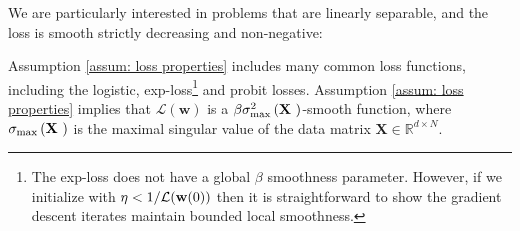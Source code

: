 \documentclass[twoside,11pt,english]{article}
\begin{document}
We are particularly interested in problems that are linearly separable,
and the loss is smooth strictly decreasing and non-negative:

{}

{}

Assumption \ref{assum: loss properties} includes many common loss functions, including the logistic, exp-loss\footnote{The exp-loss does not have a global $\beta$ smoothness parameter. However, if we initialize with $\eta < 1/ \mathcal{L}(\mathbf{w}(0))$ then it is straightforward to show the gradient descent iterates maintain bounded local smoothness.} and probit losses.
Assumption \ref{assum: loss properties} implies
that $\mathcal{L}\left(\mathbf{w}\right)$ is a $\beta\sigma_{\max}^{2}\left(\text{\ensuremath{\mathbf{X}} }\right)$-smooth
function, where 
$\sigma_{\max}\left(\text{\ensuremath{\mathbf{X}} }\right)$ is the
maximal singular value of the data matrix $\mathbf{X}\in\mathbb{R}^{d\times N}$.
\end{document}
